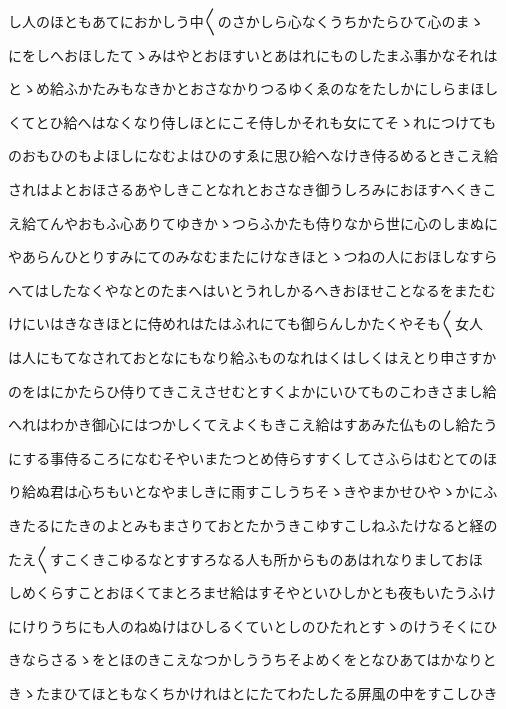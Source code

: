 \documentclass[a4paper,11pt,landscape]{ltjtarticle}
\begin{document}
\par\medskip
し人のほともあてにおかしう中〱のさかしら心なくうちかたらひて心のまゝ
\par\medskip
にをしへおほしたてゝみはやとおほすいとあはれにものしたまふ事かなそれは
\par\medskip
とゝめ給ふかたみもなきかとおさなかりつるゆくゑのなをたしかにしらまほし
\par\medskip
くてとひ給へはなくなり侍しほとにこそ侍しかそれも女にてそゝれにつけても
\par\medskip
のおもひのもよほしになむよはひのすゑに思ひ給へなけき侍るめるときこえ給
\par\medskip
されはよとおほさるあやしきことなれとおさなき御うしろみにおほすへくきこ
\par\medskip
え給てんやおもふ心ありてゆきかゝつらふかたも侍りなから世に心のしまぬに
\par\medskip
やあらんひとりすみにてのみなむまたにけなきほとゝつねの人におほしなすら
\par\medskip
へてはしたなくやなとのたまへはいとうれしかるへきおほせことなるをまたむ
\par\medskip
けにいはきなきほとに侍めれはたはふれにても御らんしかたくやそも〱女人
\par\medskip
は人にもてなされておとなにもなり給ふものなれはくはしくはえとり申さすか
\par\medskip
のをはにかたらひ侍りてきこえさせむとすくよかにいひてものこわきさまし給
\par\medskip
へれはわかき御心にはつかしくてえよくもきこえ給はすあみた仏ものし給たう
\par\medskip
にする事侍るころになむそやいまたつとめ侍らすすくしてさふらはむとてのほ
\par\medskip
り給ぬ君は心ちもいとなやましきに雨すこしうちそゝきやまかせひやゝかにふ
\par\medskip
きたるにたきのよとみもまさりておとたかうきこゆすこしねふたけなると経の
\par\medskip
たえ〱すこくきこゆるなとすすろなる人も所からものあはれなりましておほ
\par\medskip
しめくらすことおほくてまとろませ給はすそやといひしかとも夜もいたうふけ
\par\medskip
にけりうちにも人のねぬけはひしるくていとしのひたれとすゝのけうそくにひ
\par\medskip
きならさるゝをとほのきこえなつかしううちそよめくをとなひあてはかなりと
\par\medskip
きゝたまひてほともなくちかけれはとにたてわたしたる屏風の中をすこしひき
\par\medskip
\end{document}
